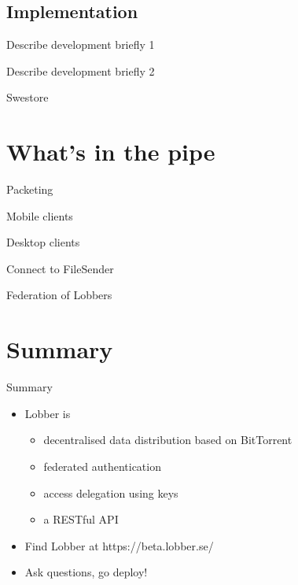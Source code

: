 \documentclass{beamer}
\begin{document}
\subsection{Implementation}
\begin{frame}{Describe development briefly 1}
\end{frame}
\begin{frame}{Describe development briefly 2}
\end{frame}
\begin{frame}{Swestore}
\end{frame}
\section{What's in the pipe}
\begin{frame}{Packeting}
\end{frame}
\begin{frame}{Mobile clients}
\end{frame}
\begin{frame}{Desktop clients}
\end{frame}
\begin{frame}{Connect to FileSender}
\end{frame}
\begin{frame}{Federation of Lobbers}
\end{frame}
\section*{Summary}

\begin{frame}{Summary}
  \begin{itemize}
  \item
    Lobber is
    \begin{itemize}
    \item
      decentralised data distribution based on BitTorrent
    \item
      federated authentication 
    \item
      access delegation using keys
    \item
      a RESTful API
    \end{itemize}
  \item
    Find Lobber at https://beta.lobber.se/
  \item
    Ask questions, go deploy!
  \end{itemize}
\end{frame}  
\end{document}
